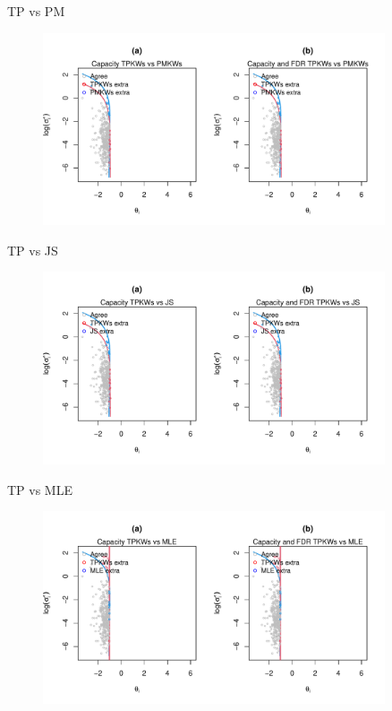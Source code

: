 \documentclass[10pt,mathserif,aspectratio=169]{beamer}
\begin{document}
\begin{frame}{TP vs PM}
  \begin{figure}
    \centering
    \includegraphics[width=0.9\textwidth]{../../Figures/2013-2022/GMM_m/GLmix/Contour_Left_0.2_0.2_TPKWs_PMKWs.pdf}
  \end{figure}
\end{frame}

\begin{frame}{TP vs JS}
  \begin{figure}
    \centering
    \includegraphics[width=0.9\textwidth]{../../Figures/2013-2022/GMM_m/GLmix/Contour_Left_0.2_0.2_TPKWs_JS.pdf}
  \end{figure}
\end{frame}

\begin{frame}{TP vs MLE}
  \begin{figure}
    \centering
    \includegraphics[width=0.9\textwidth]{../../Figures/2013-2022/GMM_m/GLmix/Contour_Left_0.2_0.2_TPKWs_MLE.pdf}
  \end{figure}
\end{frame}
\end{document}
